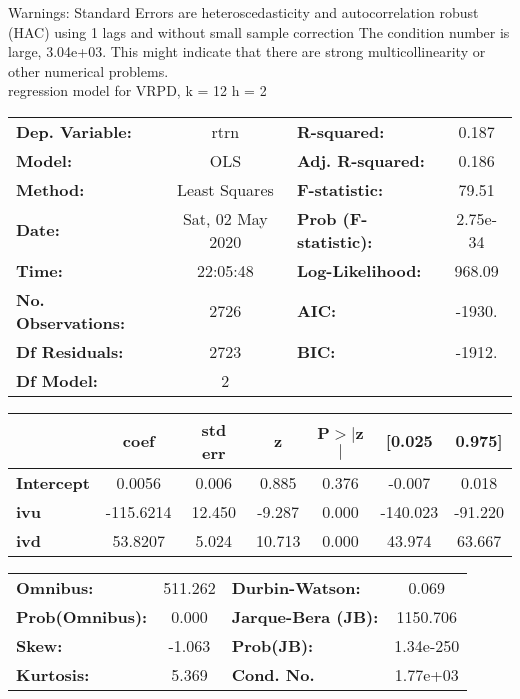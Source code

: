 Warnings: \newline
 [1] Standard Errors are heteroscedasticity and autocorrelation robust (HAC) using 1 lags and without small sample correction \newline
 [2] The condition number is large, 3.04e+03. This might indicate that there are \newline
 strong multicollinearity or other numerical problems.\\ 

regression model for VRPD, k = 12 h = 2\begin{center}
\begin{tabular}{lclc}
\toprule
\textbf{Dep. Variable:}    &       rtrn       & \textbf{  R-squared:         } &     0.187   \\
\textbf{Model:}            &       OLS        & \textbf{  Adj. R-squared:    } &     0.186   \\
\textbf{Method:}           &  Least Squares   & \textbf{  F-statistic:       } &     79.51   \\
\textbf{Date:}             & Sat, 02 May 2020 & \textbf{  Prob (F-statistic):} &  2.75e-34   \\
\textbf{Time:}             &     22:05:48     & \textbf{  Log-Likelihood:    } &    968.09   \\
\textbf{No. Observations:} &        2726      & \textbf{  AIC:               } &    -1930.   \\
\textbf{Df Residuals:}     &        2723      & \textbf{  BIC:               } &    -1912.   \\
\textbf{Df Model:}         &           2      & \textbf{                     } &             \\
\bottomrule
\end{tabular}
\begin{tabular}{lcccccc}
                   & \textbf{coef} & \textbf{std err} & \textbf{z} & \textbf{P$> |$z$|$} & \textbf{[0.025} & \textbf{0.975]}  \\
\midrule
\textbf{Intercept} &       0.0056  &        0.006     &     0.885  &         0.376        &       -0.007    &        0.018     \\
\textbf{ivu}       &    -115.6214  &       12.450     &    -9.287  &         0.000        &     -140.023    &      -91.220     \\
\textbf{ivd}       &      53.8207  &        5.024     &    10.713  &         0.000        &       43.974    &       63.667     \\
\bottomrule
\end{tabular}
\begin{tabular}{lclc}
\textbf{Omnibus:}       & 511.262 & \textbf{  Durbin-Watson:     } &     0.069  \\
\textbf{Prob(Omnibus):} &   0.000 & \textbf{  Jarque-Bera (JB):  } &  1150.706  \\
\textbf{Skew:}          &  -1.063 & \textbf{  Prob(JB):          } & 1.34e-250  \\
\textbf{Kurtosis:}      &   5.369 & \textbf{  Cond. No.          } &  1.77e+03  \\
\bottomrule
\end{tabular}
\end{center}

